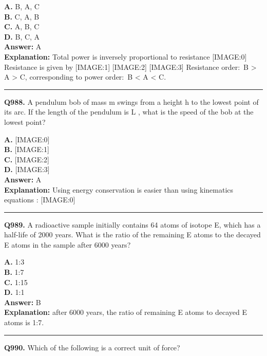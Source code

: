\documentclass[12pt]{article}
\begin{document}
\textbf{A.} B, A, C \\
\textbf{B.} C, A, B \\
\textbf{C.} A, B, C \\
\textbf{D.} B, C, A \\

\textbf{Answer:} A \\
\textbf{Explanation:} Total power is inversely proportional to resistance
[IMAGE:0]
Resistance is given by
[IMAGE:1]
[IMAGE:2]
[IMAGE:3]
Resistance order: B > A > C, corresponding to power order: B < A < C.

\hrule
\vspace{1em}


\noindent
\textbf{Q988.} A pendulum bob of mass
m
swings from a height
h
to the lowest point of its arc. If the length of the pendulum is
L
, what is the speed of the bob at the lowest point?



\textbf{A.} [IMAGE:0] \\
\textbf{B.} [IMAGE:1] \\
\textbf{C.} [IMAGE:2] \\
\textbf{D.} [IMAGE:3] \\

\textbf{Answer:} A \\
\textbf{Explanation:} Using energy conservation is easier than using kinematics equations :
[IMAGE:0]

\hrule
\vspace{1em}


\noindent
\textbf{Q989.} A radioactive sample initially contains 64 atoms of isotope E, which has a half-life of 2000 years. What is the ratio of the remaining E atoms to the decayed E atoms in the sample after 6000 years?



\textbf{A.} 1:3 \\
\textbf{B.} 1:7 \\
\textbf{C.} 1:15 \\
\textbf{D.} 1:1 \\

\textbf{Answer:} B \\
\textbf{Explanation:} after 6000 years, the ratio of remaining E atoms to decayed E atoms is 1:7.

\hrule
\vspace{1em}


\noindent
\textbf{Q990.} Which of the following is a correct unit of force?
\end{document}
